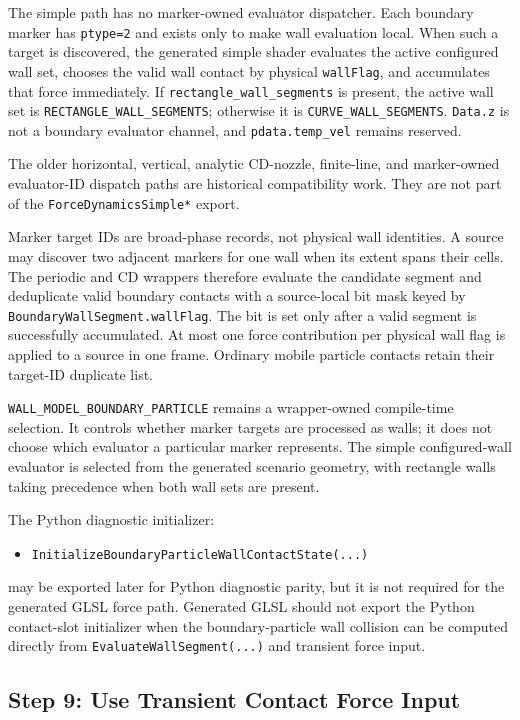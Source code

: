 The simple path has no marker-owned evaluator dispatcher.  Each boundary
marker has \texttt{ptype=2} and exists only to make wall evaluation local.
When such a target is discovered, the generated simple shader evaluates the
active configured wall set, chooses the valid wall contact by physical
\texttt{wallFlag}, and accumulates that force immediately.  If
\texttt{rectangle\_wall\_segments} is present, the active wall set is
\texttt{RECTANGLE\_WALL\_SEGMENTS}; otherwise it is
\texttt{CURVE\_WALL\_SEGMENTS}.  \texttt{Data.z} is not a boundary evaluator
channel, and \texttt{pdata.temp\_vel} remains reserved.

The older horizontal, vertical, analytic CD-nozzle, finite-line, and
marker-owned evaluator-ID dispatch paths are historical compatibility work.
They are not part of the \texttt{ForceDynamicsSimple*} export.

Marker target IDs are broad-phase records, not physical wall identities.  A
source may discover two adjacent markers for one wall when its extent spans
their cells.  The periodic and CD wrappers therefore evaluate the candidate
segment and deduplicate valid boundary contacts with a source-local bit mask
keyed by \texttt{BoundaryWallSegment.wallFlag}.  The bit is set only after a
valid segment is successfully accumulated.  At most one force contribution
per physical wall flag is applied to a source in one frame.  Ordinary mobile
particle contacts retain their target-ID duplicate list.

\texttt{WALL\_MODEL\_BOUNDARY\_PARTICLE} remains a wrapper-owned compile-time
selection.  It controls whether marker targets are processed as walls; it does
not choose which evaluator a particular marker represents.  The simple
configured-wall evaluator is selected from the generated scenario geometry,
with rectangle walls taking precedence when both wall sets are present.

The Python diagnostic initializer:
\begin{itemize}
    \item \texttt{InitializeBoundaryParticleWallContactState(...)}
\end{itemize}
may be exported later for Python diagnostic parity, but it is not required for
the generated GLSL force path.  Generated GLSL should not export the Python
contact-slot initializer when the boundary-particle wall collision can be
computed directly from \texttt{EvaluateWallSegment(...)} and transient force
input.

\subsection{Step 9: Use Transient Contact Force Input}

